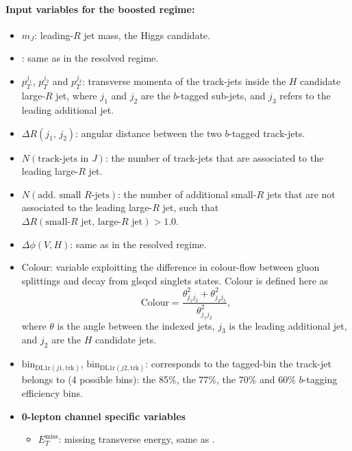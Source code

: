 
\paragraph{Input variables for the boosted regime:}
\begin{itemize}
  \item $m_J$: leading-$R$ jet mass, the Higgs candidate.
  \item \ptv: same as in the resolved regime.
  \item $p_{T}^{j_1}$, $p_{T}^{j_2}$ and $p_{T}^{j_3}$: transverse momenta of the track-jets inside the $H$ candidate large-$R$ jet, where $j_1$ and $j_2$ are the $b$-tagged sub-jets, and $j_3$ refers to the leading additional jet.
  \item $\Delta R(j_1,\,j_2)$: angular distance between the two $b$-tagged track-jets.  
  \item $N(\text{track-jets in $J$})$: the number of track-jets that are associated to the leading large-$R$ jet. 
  \item $N(\text{add. small $R$-jets})$: the number of additional small-$R$ jets that are not associated to the leading large-$R$ jet, such that $\Delta R (\text{small-$R$ jet, large-$R$ jet}) > 1.0$.  
  \item  $\Delta \phi(\textbf{$V$},\textbf{$H$})$: same as in the resolved regime.
  \item Colour: variable exploitting the difference in colour-flow between gluon splittings and decay from gls{qcd} singlets states. Colour is defined here as \[ \textrm{Colour} = \frac{\theta_{j_1j_3}^2 + \theta_{j_2j_3}^2}{\theta_{j_1j_2}^2},\] where $\theta$ is the angle between the indexed jets, $j_3$ is the leading additional jet, and $j_2$ are the $H$ candidate jets.
  \item $\mathrm{bin}_{\mathrm{DL1r}(j1,\text{trk})}$, $\mathrm{bin}_{\mathrm{DL1r}(j2,\text{trk})}$: corresponds to the tagged-bin the track-jet belongs to (4 possible bins): 
  the 85\%, the 77\%, the 70\% and 60\% $b$-tagging efficiency bins.
  \item \textbf{0-lepton channel specific variables}
  \begin{itemize}
      \item $E_T^{\textrm{miss}}$: missing transverse energy, same as \ptv.

\end{itemize}
\end{itemize}
